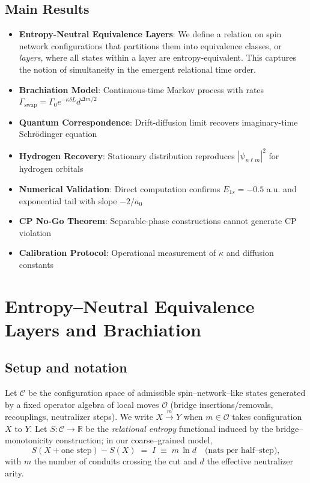 \documentclass[11pt]{article}
\theoremstyle{plain}
\theoremstyle{definition}
\begin{document}
\subsection{Main Results}

\begin{tcolorbox}[title=Key Results of This Paper]
  \begin{itemize}
    \item \textbf{Entropy-Neutral Equivalence Layers}: We define a relation on spin network configurations that partitions them into equivalence classes, or \emph{layers}, where all states within a layer are entropy-equivalent. This captures the notion of simultaneity in the emergent relational time order.
    \item \textbf{Brachiation Model}: Continuous-time Markov process with rates $\Gamma_{\text{swap}} = \Gamma_0 e^{-\kappa\delta L} d^{\Delta m/2}$
    \item \textbf{Quantum Correspondence}: Drift-diffusion limit recovers imaginary-time Schrödinger equation
    \item \textbf{Hydrogen Recovery}: Stationary distribution reproduces $|\psi_{n\ell m}|^2$ for hydrogen orbitals
    \item \textbf{Numerical Validation}: Direct computation confirms $E_{1s} = -0.5$ a.u. and exponential tail with slope $-2/a_0$
    \item \textbf{CP No-Go Theorem}: Separable-phase constructions cannot generate CP violation
    \item \textbf{Calibration Protocol}: Operational measurement of $\kappa$ and diffusion constants
  \end{itemize}
\end{tcolorbox}


\section{Entropy–Neutral Equivalence Layers and Brachiation}

\subsection{Setup and notation}
Let $\mathcal{C}$ be the configuration space of admissible spin–network–like states generated by a fixed operator algebra of local moves $\mathcal{O}$ (bridge insertions/removals, recouplings, neutralizer steps).
We write $X \xrightarrow{\,m\,} Y$ when $m\in\mathcal{O}$ takes configuration $X$ to $Y$.
Let $S:\mathcal{C}\to\mathbb{R}$ be the \emph{relational entropy} functional induced by the bridge–monotonicity construction; in our coarse–grained model,
\[
  S(X+\text{one step})-S(X)\;=\; I \;\equiv\; m\,\ln d \quad\text{(nats per half–step)},
\]
with $m$ the number of conduits crossing the cut and $d$ the effective neutralizer arity.
\end{document}
